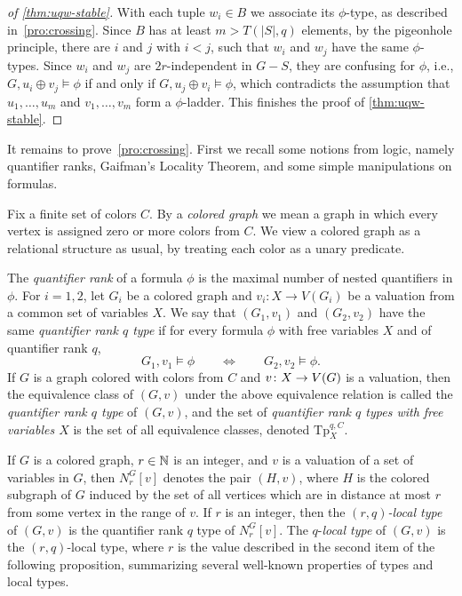\begin{proof}[of \cref{thm:uqw-stable}]
With each tuple $w_i\in B$ we associate its $\phi$-type, as described in~\cref{pro:crossing}.
Since $B$ has at least $m>T(|S|,q)$ elements, by
 the pigeonhole principle, there are $i$ and $j$ 
with $i<j$, such that $ w_i$ and $w_j$ have the same $\phi$-types. Since $w_i$ and $w_j$ are $2r$-independent in $G-S$, they are confusing for $\phi$, i.e., 
 $G,u_i\oplus v_j\models \phi$ 
 if and only if $G,u_j\oplus v_i\models \phi$, which contradicts the assumption that $u_1,\ldots, u_m$ and $ v_1,\ldots, v_m$ form a $\phi$-ladder.
 This finishes the proof of \cref{thm:uqw-stable}.
\end{proof}
It remains to prove~\cref{pro:crossing}. 
First we recall some notions from logic, namely quantifier ranks, Gaifman's Locality Theorem, and some simple manipulations on formulas.

 Fix a finite set of  colors $C$.
By a \emph{colored graph} we mean a graph  in which 
every vertex is assigned zero or more colors from $C$. We view a colored graph as a relational structure as usual, by treating each color as a unary predicate. 

The \emph{quantifier rank} of a formula $\phi$ is the maximal number of nested quantifiers in $\phi$.
For $i=1,2$, let $G_i$
be a colored graph and $v_i:X\to V(G_i)$ be a valuation
from a common set of variables $X$.
We say that $(G_1, v_1)$ and $(G_2,v_2)$
have the same \emph{quantifier rank $q$ type} %
if for every formula $\phi$ with  free variables $X$ and of quantifier rank $q$,
 $$G_1,v_1\models \phi\qquad\iff \qquad G_2,v_2\models \phi.$$
If $G$ is a graph colored with colors from $C$ and 
 $v\colon X\to V(G)$ is a valuation, 
then the equivalence class of $(G, v)$ under the above equivalence relation is called the \emph{quantifier rank $q$ type} of $(G,v)$, and  the set of \emph{quantifier rank $q$ types with  free variables $X$}
is the set of all equivalence classes, denoted
$\mathrm{Tp}^{q,C}_X$.

 If $G$ is a colored graph, $r\in\mathbb{N}$ is an integer, and $v$ is a valuation of a set of variables in $G$, then  $N^G_r[v]$ denotes the pair $(H,v)$, where $H$ is the colored subgraph of $G$
induced by the set of all vertices which are in distance at most $r$
from some vertex in the range of $v$.
If $r$ is an integer, then the \emph{$(r,q)$-local type} of $(G,v)$ is 
the quantifier rank $q$ type of $N^G_r[v]$. The $q$-\emph{local type} of $(G,v)$ is the $(r,q)$-local type, where $r$   is the value described in the second item of the following proposition,  summarizing several well-known properties of types and local types.


